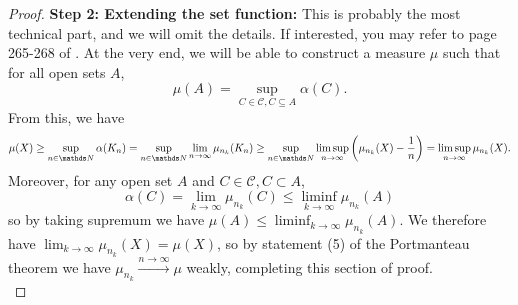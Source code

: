 \begin{unexaminable}
\begin{proof}
\textbf{Step 2: Extending the set function:} This is probably the most technical part, and we will omit the details. If interested, you may refer to page 265-268 of \cite{AchimProbability}. At the very end, we will be able to construct a measure $\mu$ such that for all open sets $A$,
\begin{equation}
    \mu(A) = \sup_{C \in \mathcal{C}, C \subseteq A} \alpha(C).
\end{equation}
From this, we have 
\begin{align*}
\mu(X) \geq \sup_{n \in \N} \alpha(K_n)  = \sup_{n\in \N} \lim_{n\to\infty} \mu_{n_k}(K_n) \geq \sup_{n\in \N} \limsup_{n\to\infty} \bracket{\mu_{n_k}(X) - \frac{1}{n}} = \limsup_{n\to\infty} \mu_{n_k}(X).
\end{align*}
Moreover, for any open set $A$ and $C \in \mathcal{C}, C \subset A$, 
\begin{equation*}
\alpha(C) = \lim_{k\to\infty} \mu_{n_k}(C) \leq \liminf_{k\to\infty} \mu_{n_k}(A)
\end{equation*}
so by taking supremum we have $\mu(A) \leq \liminf_{k\to\infty} \mu_{n_k}(A)$. We therefore have $\lim_{k\to\infty} \mu_{n_k}(X) = \mu(X)$, so by statement (5) of the Portmanteau theorem we have $\mu_{n_k} \overset{n\to\infty}\to \mu$ weakly, completing this section of proof. \\


\end{proof}
\end{unexaminable}
